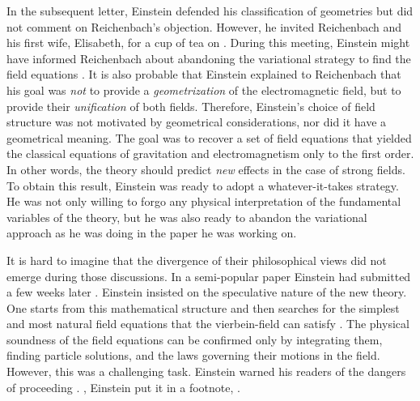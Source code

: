 \documentclass[final]{article}
\newcommand{\vbein}{vierbein\xspace}
\begin{document}
In the subsequent letter, Einstein defended his classification of geometries but did not comment on Reichenbach's objection. However, he invited Reichenbach and his first wife, Elisabeth, for a cup of tea on . During this meeting, Einstein might have informed Reichenbach about abandoning the variational strategy to find the field equations \citep{Sauer2006}. It is also probable that Einstein explained to Reichenbach that his goal was \emph{not} to provide a \emph{geometrization} of the electromagnetic field, but to provide their \emph{unification} of both fields. Therefore, Einstein's choice of field structure was not motivated by geometrical considerations, nor did it have a geometrical meaning. The goal was to recover a set of field equations that yielded the classical equations of gravitation and electromagnetism only to the first order. In other words, the theory should predict \emph{new} effects in the case of strong fields. To obtain this result, Einstein was ready to adopt a whatever-it-takes strategy. He was not only willing to forgo any physical interpretation of the fundamental variables of the theory, but he was also ready to abandon the variational approach as he was doing in the paper he was working on. 

It is hard to imagine that the divergence of their philosophical views did not emerge during those discussions. In a semi-popular paper Einstein had submitted a few weeks later \citep[131]{Einstein1929}. Einstein insisted on the speculative nature of the new theory. One starts from this mathematical structure and then searches for the simplest and most natural field equations that the \vbein-field can satisfy \citep[131]{Einstein1929}. The physical soundness of the field equations can be confirmed only by integrating them, finding particle solutions, and the laws governing their motions in the field. However, this was a challenging task. Einstein warned his readers of the dangers of proceeding  \citep[127]{Einstein1929}. , Einstein put it in a footnote,  \citep[127]{Einstein1929}.
\end{document}
